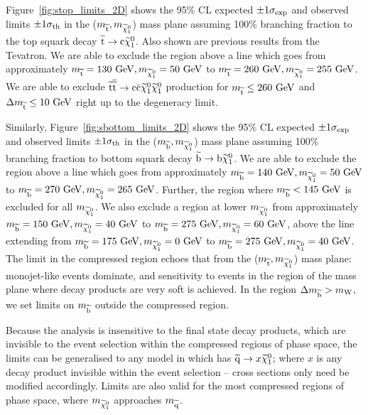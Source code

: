 Figure~\ref{fig:stop_limits_2D} shows the 95\% CL expected $\pm 1 \sigma_{\rm exp}$ and observed limits $\pm 1 \sigma_{\rm th}$ in the ($m_{\widetilde{{\rm t}}},m_{\widetilde{\chi}^{0}_{1}}$) mass plane assuming 100\% branching fraction to the top squark decay $\widetilde{{\rm t}} \rightarrow {\rm c} \widetilde{\chi}^{0}_{1}$.
Also shown are previous results from the Tevatron.
We are able to exclude the region above a line which goes from approximately $m_{\widetilde{{\rm t}}}=130~\mathrm{GeV}, m_{\widetilde{\chi}^{0}_{1}}=50~\mathrm{GeV}$ to $m_{\widetilde{{\rm t}}}=260~\mathrm{GeV}, m_{\widetilde{\chi}^{0}_{1}}=255~\mathrm{GeV}$.  
We are able to exclude $\widetilde{{\rm t}} \overline{\widetilde{\mathrm{t}}} \rightarrow \rm c \bar{\rm c} \widetilde{\chi}^{0}_{1} \widetilde{\chi}^{0}_{1}$ production for $m_{\widetilde{{\rm t}}} \leq 260~\mathrm{GeV}$ and $\Delta m_{\widetilde{{\rm t}}} \leq 10~\mathrm{GeV}$ right up to the degeneracy limit. 

Similarly, Figure~\ref{fig:sbottom_limits_2D} shows the 95\% CL expected $\pm 1 \sigma_{\rm exp}$ and observed limits $\pm 1 \sigma_{\rm th}$ in the ($m_{\widetilde{{\rm b}}},m_{\widetilde{\chi}^{0}_{1}}$) mass plane assuming 100\% branching fraction to bottom squark decay $\widetilde{{\rm b}} \rightarrow {\rm b} \widetilde{\chi}^{0}_{1}$.
We are able to exclude the region above a line which goes from approximately $m_{\widetilde{{\rm b}}}=140~\mathrm{GeV}, m_{\widetilde{\chi}^{0}_{1}}=50~\mathrm{GeV}$ to $m_{\widetilde{{\rm b}}}=270~\mathrm{GeV}, m_{\widetilde{\chi}^{0}_{1}}=265~\mathrm{GeV}$.  
Further, the region where $m_{\widetilde{{\rm b}}} < 145~\mathrm{GeV}$ is excluded for all $m_{\widetilde{\chi}^{0}_{1}}$.
We also exclude a region at lower $m_{\widetilde{\chi}^{0}_{1}}$ from approximately $m_{\widetilde{{\rm b}}}=150~\mathrm{GeV}, m_{\widetilde{\chi}^{0}_{1}}=40~\mathrm{GeV}$ to $m_{\widetilde{{\rm b}}}=275~\mathrm{GeV}, m_{\widetilde{\chi}^{0}_{1}}=60~\mathrm{GeV}$, above the line extending from $m_{\widetilde{{\rm b}}}=175~\mathrm{GeV}, m_{\widetilde{\chi}^{0}_{1}}=0~\mathrm{GeV}$ to $m_{\widetilde{{\rm b}}}=275~\mathrm{GeV}, m_{\widetilde{\chi}^{0}_{1}}=40~\mathrm{GeV}$.
The limit in the compressed region echoes that from the ($m_{\widetilde{{\rm t}}},m_{\widetilde{\chi}^{0}_{1}}$) mass plane: monojet-like events dominate, and sensitivity to events in the region of the mass plane where decay products are very soft is achieved. 
In the region $\Delta m_{\widetilde{{\rm b}}}>m_{\mathrm{W}}$, we set limits on $m_{\widetilde{{\rm b}}}$ outside the compressed region. 

Because the analysis is insensitive to the final state decay products, which are invisible to the event selection within the compressed regions of phase space, the limits can be generalised to any model in which has $\widetilde{{\rm q}} \rightarrow x \widetilde{\chi}^{0}_{1}$; where $x$ is any decay product invisible within the event selection -- cross sections only need be modified accordingly. 
Limits are also valid for the most compressed regions of phase space, where $m_{\widetilde{\chi}^{0}_{1}}$ approaches $m_{\widetilde{{\rm q}}}$.


